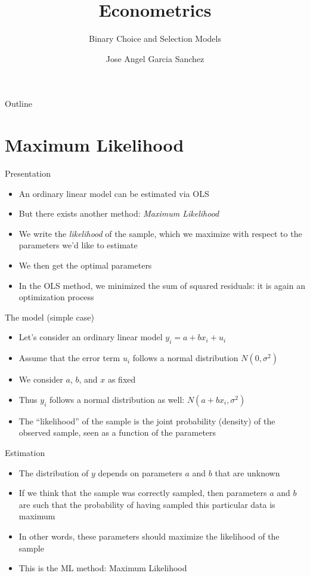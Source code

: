 \documentclass[aspectratio=169]{beamer}
\title{Econometrics}
\subtitle{Binary Choice and Selection Models}
\author{Jose Angel Garcia Sanchez}
\institute{Université Paris 1 Panthéon-Sorbonne}
\date{} %
\begin{document}
{
\begin{frame}
\titlepage
\end{frame}
}

\begin{frame}{Outline}
\tableofcontents
\end{frame}

\section{Maximum Likelihood}

\begin{frame}{Presentation}
\begin{itemize}
    \item An ordinary linear model can be estimated via OLS
    \item But there exists another method: \textit{Maximum Likelihood}
    \item We write the \textit{likelihood} of the sample, which we maximize with respect to the parameters we'd like to estimate
    \item We then get the optimal parameters
    \item In the OLS method, we minimized the sum of squared residuals: it is again an optimization process
\end{itemize}
\end{frame}

\begin{frame}{The model (simple case)}
\begin{itemize}
    \item Let's consider an ordinary linear model $y_i = a + bx_i + u_i$
    \item Assume that the error term $u_i$ follows a normal distribution $N(0, \sigma^2)$
    \item We consider $a$, $b$, and $x$ as fixed
    \item Thus $y_i$ follows a normal distribution as well: $N(a + bx_i, \sigma^2)$
    \item The ``likelihood'' of the sample is the joint probability (density) of the observed sample, seen as a function of the parameters
\end{itemize}
\end{frame}

\begin{frame}{Estimation}
\begin{itemize}
    \item The distribution of $y$ depends on parameters $a$ and $b$ that are unknown
    \item If we think that the sample was correctly sampled, then parameters $a$ and $b$ are such that the probability of having sampled this particular data is maximum
    \item In other words, these parameters should maximize the likelihood of the sample
    \item This is the ML method: Maximum Likelihood
\end{itemize}
\end{frame}
\end{document}
